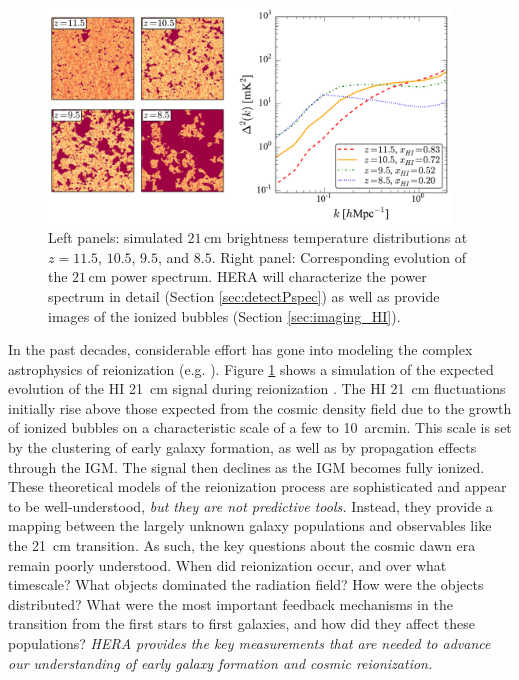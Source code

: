 \documentclass[preprint]{aastex}
\begin{document}
\begin{figure}[!ht]\centering
\includegraphics[width=0.95\textwidth]{plots/cubes/cubesAndPspecs.pdf}
\caption{\small 
Left panels: simulated $21\,\textrm{cm}$ brightness temperature distributions at $z=11.5$, $10.5$, $9.5$, and $8.5$.  Right panel: Corresponding evolution of the $21\,\textrm{cm}$ power spectrum.  HERA will characterize the power spectrum in detail (Section \ref{sec:detectPspec}) as well as provide images of the ionized bubbles (Section \ref{sec:imaging_HI}).
}\label{fig:EoRsims} \end{figure}

In the past decades, considerable effort has gone into modeling the complex astrophysics of reionization
(e.g. \citealt{shapiro_giroux1987, haiman_loeb1997, furlanetto_et_al2004, santos_et_al2010}). Figure \ref{fig:EoRsims} shows a 
simulation of the expected evolution of the HI 21~cm signal during reionization \citep{mesinger_furlanetto2007}. The HI 21~cm fluctuations initially 
rise above those expected from the cosmic density field due to the growth of ionized bubbles on a characteristic 
scale of a few to 10~arcmin. This scale is set by the clustering of early galaxy formation, as well as by 
propagation effects through the IGM. The signal then declines as the IGM becomes fully ionized.  These theoretical 
models of the reionization process are sophisticated and appear to be well-understood, {\it but they are not 
predictive tools.} Instead, they provide a mapping between the largely unknown galaxy populations and observables 
like the 21~cm transition. As such, the key questions about the cosmic dawn era remain poorly understood.  When 
did reionization occur, and over what timescale?  What objects dominated the radiation field?  How were the 
objects distributed?  What were the most important feedback mechanisms in the transition from the first stars to
first galaxies, and how did they affect these populations?  {\it HERA provides the key measurements that are needed 
to advance our understanding of early galaxy formation and cosmic reionization.}
\end{document}
